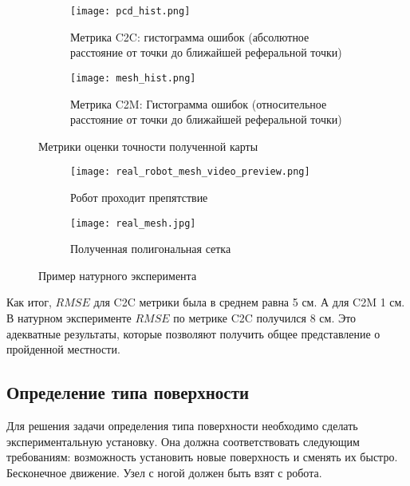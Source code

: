 \begin{figure}[H]
    \begin{subfigure}[t]{0.49\textwidth}
        \centering\texttt{[image: pcd\_hist.png]}
        \caption{Метрика C2C: гистограмма ошибок (абсолютное расстояние от точки до ближайшей реферальной точки)}
        \label{fig:metric_c2c}
    \end{subfigure}
    \begin{subfigure}[t]{0.49\textwidth}
        \centering\texttt{[image: mesh\_hist.png]}
        \caption{Метрика C2M: Гистограмма ошибок (относительное расстояние от точки до ближайшей реферальной точки)}
        \label{fig:metric_c2m}
    \end{subfigure}
    \caption{Метрики оценки точности полученной карты}
    \label{fig:metrics}
\end{figure}


\begin{figure}[H]
    \begin{subfigure}[t]{0.49\textwidth}
            \centering\texttt{[image: real\_robot\_mesh\_video\_preview.png]}
        \caption{Робот проходит препятствие}
        \label{fig:real_robot_mesh_video_preview.png}
    \end{subfigure}
    \begin{subfigure}[t]{0.49\textwidth}
        \centering\texttt{[image: real\_mesh.jpg]}
        \caption{Полученная полигональная сетка}
        \label{fig:real_mesh.jpg}
    \end{subfigure}
    \caption{Пример натурного эксперимента}
    \label{fig:real_exp_map_creation}
\end{figure}

Как итог, $RMSE$ для C2C метрики была в среднем равна 5 см. А для C2M 1 см. В натурном эксперименте $RMSE$ по метрике C2C получился 8 см. Это адекватные результаты, которые позволяют получить общее представление о пройденной местности.

\subsection{Определение типа поверхности}

Для решения задачи определения типа поверхности необходимо сделать экспериментальную установку. Она должна соответствовать следующим требованиям: возможность установить новые поверхность и сменять их быстро. Бесконечное движение. Узел с ногой должен быть взят с робота.

